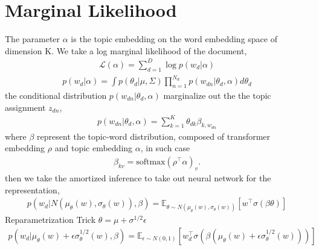 \section{Marginal Likelihood}
The parameter $ \alpha $ is the topic embedding on the word embedding space of dimension K. We take a log marginal likelihood of the document,
\begin{align*}
\mathcal{L}(\alpha)=\sum_{d=1}^{D}\log p(w_d|\alpha)
\end{align*}
\begin{align*}
p(w_d|\alpha)=\int p(\theta_d|\mu,\Sigma)\prod_{n=1}^{N_d}p(w_{dn}|\theta_d,\alpha)d\theta_d
\end{align*}
the conditional distribution $ p(w_{dn}|\theta_d,\alpha) $ marginalize out the the topic assignment $ z_{dn} $,
\begin{align*}
p(w_{dn}|\theta_d,\alpha)=\sum_{k=1}^{K}\theta_{dk}\beta_{k,w_{dn}}
\end{align*}
where $ \beta $ represent the topic-word distribution, composed of transformer embedding $ \rho $ and topic embedding $ \alpha $, in such case
\begin{align*}
\beta_{kv}=\text{softmax}(\rho^\top\alpha)_{v}.
\end{align*}
then we take the amortized inference to take out neural network for the representation,
\begin{align*}
p(w_{d}|N(\mu_\theta(w),\sigma_\theta(w)),\beta)=\mathbb{E}_{\theta\sim N(\mu_\theta(w),\sigma_\theta(w))}\left[w^\top\sigma(\beta\theta)\right]
\end{align*}
Reparametrization Trick $ \theta=\mu+\sigma^{1/2}\epsilon $\\
\begin{align*}
p(w_{d}|\mu_\theta(w)+\epsilon\sigma^{1/2}_\theta(w),\beta)=\mathbb{E}_{\epsilon\sim N(0,1)}\left[w_d^\top\sigma(\beta(\mu_\theta(w)+\epsilon\sigma^{1/2}_\theta(w)))\right]
\end{align*}
